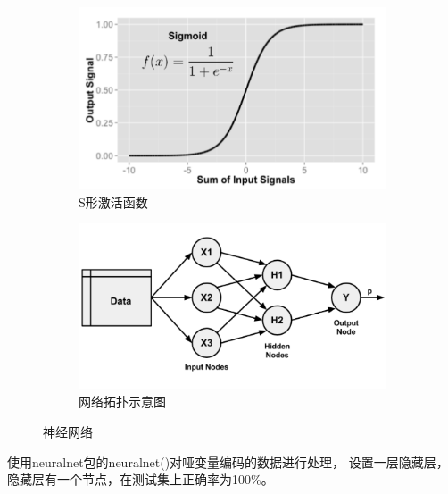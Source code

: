 \documentclass[lang=cn,11pt,a4paper,cite=super]{elegantpaper}
\begin{document}
\begin{enumerate}
\begin{figure}[htb]
      \begin{subfigure}[b]{0.50\textwidth}
        \centering
        \includegraphics[width=\linewidth]{img/nns.PNG}  
      \caption{S形激活函数}
      \label{fig:nns}
      \end{subfigure}
      \begin{subfigure}[b]{0.49\textwidth}
        \centering
        \includegraphics[width=\linewidth]{img/nnn.PNG}  
        \caption{网络拓扑示意图}
        \label{fig:nnn}
      \end{subfigure}
      \caption{神经网络}
   \end{figure}
   \par 使用neuralnet包的neuralnet()对哑变量编码的数据进行处理，
   设置一层隐藏层，隐藏层有一个节点，在测试集上正确率为100\%。


\end{enumerate}
\end{document}
